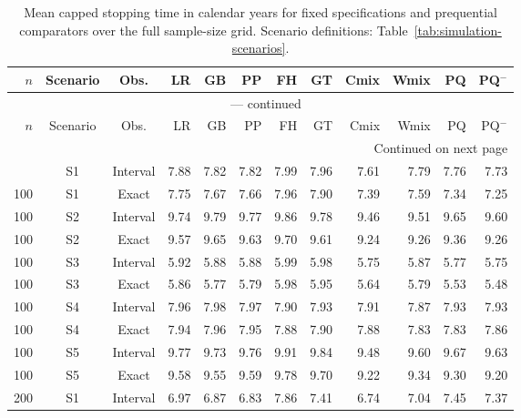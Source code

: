 \documentclass[12pt]{article}
\theoremstyle{definition}
\theoremstyle{remark}
\begin{document}
\clearpage
\begingroup
\scriptsize
\setlength{\tabcolsep}{2.5pt}
\renewcommand{\arraystretch}{1.10}
\setlength{\LTcapwidth}{\textwidth}
\begin{longtable}{rccrrrrrrrrr}
\caption{Mean capped stopping time in calendar years for fixed specifications and prequential comparators over the full sample-size grid. Scenario definitions: Table~\ref{tab:simulation-scenarios}.}\label{tab:app-fixed-design-stop}\\
\toprule
$n$ & Scenario & Obs. & LR & GB & PP & FH & GT & Cmix & Wmix & PQ & PQ$^{-}$ \\
\midrule
\endfirsthead
\multicolumn{12}{c}{\tablename\ \thetable{} --- continued}\\
\toprule
$n$ & Scenario & Obs. & LR & GB & PP & FH & GT & Cmix & Wmix & PQ & PQ$^{-}$ \\
\midrule
\endhead
\midrule
\multicolumn{12}{r}{Continued on next page}\\
\endfoot
\bottomrule
\endlastfoot
100 & S1 & Interval & 7.88 & 7.82 & 7.82 & 7.99 & 7.96 & 7.61 & 7.79 & 7.76 & 7.73 \\
100 & S1 & Exact & 7.75 & 7.67 & 7.66 & 7.96 & 7.90 & 7.39 & 7.59 & 7.34 & 7.25 \\
100 & S2 & Interval & 9.74 & 9.79 & 9.77 & 9.86 & 9.78 & 9.46 & 9.51 & 9.65 & 9.60 \\
100 & S2 & Exact & 9.57 & 9.65 & 9.63 & 9.70 & 9.61 & 9.24 & 9.26 & 9.36 & 9.26 \\
100 & S3 & Interval & 5.92 & 5.88 & 5.88 & 5.99 & 5.98 & 5.75 & 5.87 & 5.77 & 5.75 \\
100 & S3 & Exact & 5.86 & 5.77 & 5.79 & 5.98 & 5.95 & 5.64 & 5.79 & 5.53 & 5.48 \\
100 & S4 & Interval & 7.96 & 7.98 & 7.97 & 7.90 & 7.93 & 7.91 & 7.87 & 7.93 & 7.93 \\
100 & S4 & Exact & 7.94 & 7.96 & 7.95 & 7.88 & 7.90 & 7.88 & 7.83 & 7.83 & 7.86 \\
100 & S5 & Interval & 9.77 & 9.73 & 9.76 & 9.91 & 9.84 & 9.48 & 9.60 & 9.67 & 9.63 \\
100 & S5 & Exact & 9.58 & 9.55 & 9.59 & 9.78 & 9.70 & 9.22 & 9.34 & 9.30 & 9.20 \\
200 & S1 & Interval & 6.97 & 6.87 & 6.83 & 7.86 & 7.41 & 6.74 & 7.04 & 7.45 & 7.37 \\

\end{longtable}
\end{document}
